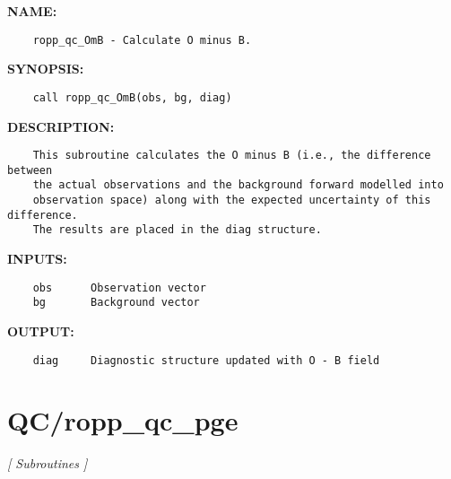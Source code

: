 \label{ch:robo50}
\label{ch:QC_ropp_qc_OmB}
\textbf{NAME:}\hspace{0.08in}\begin{Verbatim}
    ropp_qc_OmB - Calculate O minus B.
\end{Verbatim}
\textbf{SYNOPSIS:}\hspace{0.08in}\begin{Verbatim}
    call ropp_qc_OmB(obs, bg, diag)
\end{Verbatim}
\textbf{DESCRIPTION:}\hspace{0.08in}\begin{Verbatim}
    This subroutine calculates the O minus B (i.e., the difference between
    the actual observations and the background forward modelled into
    observation space) along with the expected uncertainty of this difference.
    The results are placed in the diag structure.
\end{Verbatim}
\textbf{INPUTS:}\hspace{0.08in}\begin{Verbatim}
    obs      Observation vector
    bg       Background vector
\end{Verbatim}
\textbf{OUTPUT:}\hspace{0.08in}\begin{Verbatim}
    diag     Diagnostic structure updated with O - B field
\end{Verbatim}
\section{QC/ropp\_qc\_pge}
\textsl{[ Subroutines ]}

